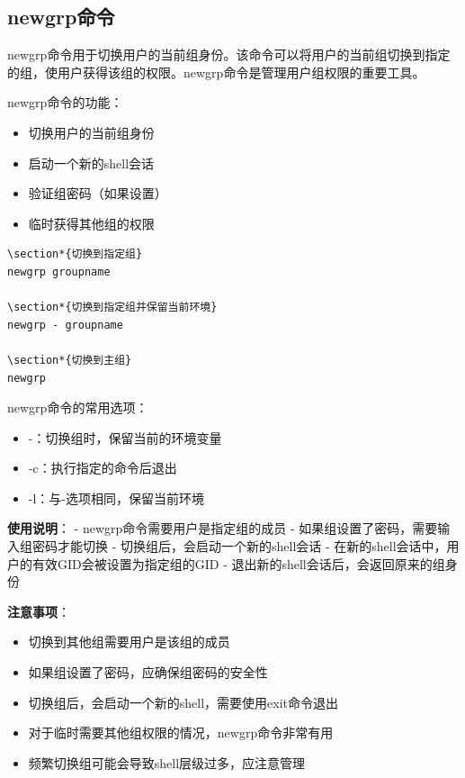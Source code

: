 \documentclass[12pt,UTF8]{ctexbook}
\begin{document}
\subsection{newgrp命令}
newgrp命令用于切换用户的当前组身份。该命令可以将用户的当前组切换到指定的组，使用户获得该组的权限。newgrp命令是管理用户组权限的重要工具。

newgrp命令的功能：
\begin{itemize}
    \item 切换用户的当前组身份
    \item 启动一个新的shell会话
    \item 验证组密码（如果设置）
    \item 临时获得其他组的权限
\end{itemize}

\begin{verbatim}
\section*{切换到指定组}
newgrp groupname

\section*{切换到指定组并保留当前环境}
newgrp - groupname

\section*{切换到主组}
newgrp
\end{verbatim}

newgrp命令的常用选项：
\begin{itemize}
    \item -：切换组时，保留当前的环境变量
    \item -c：执行指定的命令后退出
    \item -l：与-选项相同，保留当前环境
\end{itemize}

\textbf{使用说明}：
- newgrp命令需要用户是指定组的成员
- 如果组设置了密码，需要输入组密码才能切换
- 切换组后，会启动一个新的shell会话
- 在新的shell会话中，用户的有效GID会被设置为指定组的GID
- 退出新的shell会话后，会返回原来的组身份

\textbf{注意事项}：
\begin{itemize}
    \item 切换到其他组需要用户是该组的成员
    \item 如果组设置了密码，应确保组密码的安全性
    \item 切换组后，会启动一个新的shell，需要使用exit命令退出
    \item 对于临时需要其他组权限的情况，newgrp命令非常有用
    \item 频繁切换组可能会导致shell层级过多，应注意管理
\end{itemize}
\end{document}
